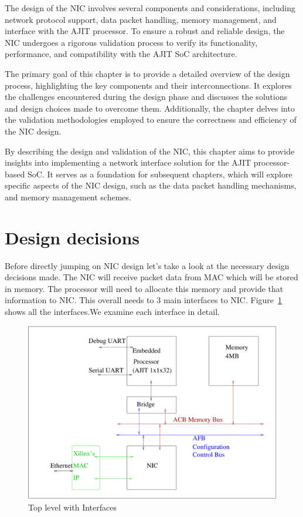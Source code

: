 \documentclass[12pt]{report}
\begin{document}
The design of the NIC involves several components and considerations, including network protocol support, data packet handling, memory management, and interface with the AJIT processor. To ensure a robust and reliable design, the NIC undergoes a rigorous validation process to verify its functionality, performance, and compatibility with the AJIT SoC architecture.

The primary goal of this chapter is to provide a detailed overview of the design process, highlighting the key components and their interconnections. It explores the challenges encountered during the design phase and discusses the solutions and design choices made to overcome them. Additionally, the chapter delves into the validation methodologies employed to ensure the correctness and efficiency of the NIC design.

By describing the design and validation of the NIC, this chapter aims to provide insights into implementing a network interface solution for the AJIT processor-based SoC. It serves as a foundation for subsequent chapters, which will explore specific aspects of the NIC design, such as the data packet handling mechanisms, and memory management schemes.

	
	\section{Design decisions}
		Before directly jumping on NIC design let's take a look at the necessary design decisions made. The NIC will receive packet data from MAC
		which will be stored in memory. The processor will need to allocate this memory and provide that information to NIC. This overall needs to
		3 main interfaces to NIC. Figure~\ref{fig:NIC-Proc-top-level} shows all the interfaces.We examine each interface in detail.	

		\begin{figure}[h]
			\centering
			\includegraphics[width=12cm]{./figures/top_level_for_interfaces.pdf}
			\caption{Top level with Interfaces}
			\label{fig:NIC-Proc-top-level}
		\end{figure}
\end{document}
